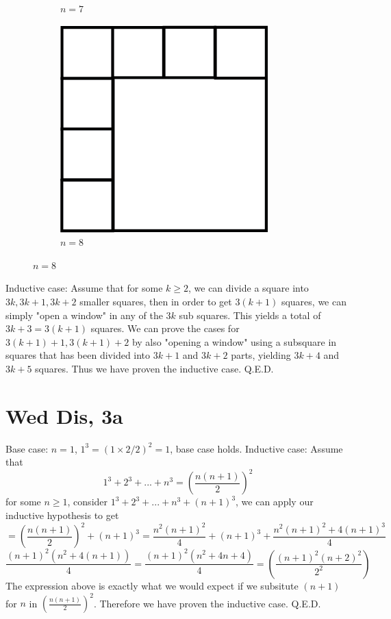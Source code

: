 \documentclass[12pt]{article}
\begin{document}
\begin{figure}[h]
\begin{subfigure}[b]{0.3\textwidth}
         \caption{$n=7$}
     \end{subfigure}
     \hfill
     \begin{subfigure}[b]{0.3\textwidth}
         \centering
         \includegraphics[width=\textwidth]{GRAPH3}
         \caption{$n=8$}
         \label{fig:five over x}
     \end{subfigure}
\end{figure}
\newline
Inductive case: Assume that for some $k \geq 2$, we can divide a square into $3k, 3k+1, 3k+2$ smaller squares, then in order to get $3(k+1)$ squares, we can simply "open a window" in any of the $3k$ sub squares. This yields a total of $3k+3 = 3(k+1)$ squares.
\newline
We can prove the cases for $3(k+1)+1, 3(k+1)+2$ by also "opening a window" using a subsquare in squares that has been divided into $3k+1$ and $3k+2$ parts, yielding $3k+4$ and $3k+5$ squares.
\newline
Thus we have proven the inductive case. Q.E.D.
\newpage


\section{Wed Dis, 3a}
Base case: $n=1$, $1^3 = (1\times2/2)^2 = 1$, base case holds.
\newline
Inductive case: Assume that $$1^3 + 2^3 + ... + n^3 = (\frac{n(n+1)}{2})^2$$
for some $n \geq 1$, consider
$1^3 + 2^3 + ... + n^3 + (n+1)^3$, we can apply our inductive hypothesis to get
$$ = (\frac{n(n+1)}{2})^2 + (n+1)^3 = \frac{n^2(n+1)^2}{4} + (n+1)^3 + \frac{n^2(n+1)^2+4(n+1)^3}{4}$$
$$\frac{(n+1)^2(n^2+4(n+1))}{4} = \frac{(n+1)^2(n^2+4n+4)}{4} = (\frac{(n+1)^2(n+2)^2}{2^2})$$
The expression above is exactly what we would expect if we subsitute $(n+1)$ for $n$ in $(\frac{n(n+1)}{2})^2$. Therefore we have proven the inductive case. Q.E.D.
\end{document}

